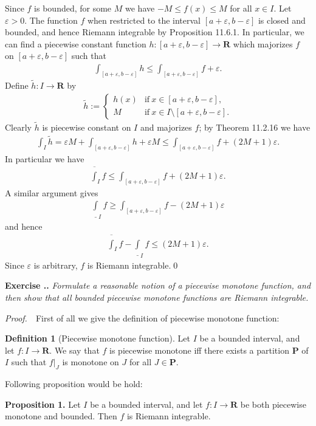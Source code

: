 \documentclass{book}
\newcommand{\pff}{\vspace{.25em}\noindent\emph{Proof.}~~}
\newcommand{\titl}[1]{\noindent\textbf{#1}}
\newcounter{Exercise}[section]
\renewcommand{\theExercise}{\thesection.\arabic{Exercise}.}
\newcommand{\new}{\vspace{1.5em}\noindent\textbf{{Exercise \stepcounter{Exercise}\textbf{\theExercise}}} }
\begin{document}
Since $f$ is bounded, for some $M$ we have $-M\leq f(x)\leq M$ for all $x\in I$. Let $\varepsilon>0$. The function $f$ when restricted to the interval $[a+\varepsilon,b-\varepsilon]$ is closed and bounded, and hence Riemann integrable by Proposition 11.6.1. In particular, we can find a piecewise constant function $h:[a+\varepsilon,b-\varepsilon]\to\mathbf{R}$ which majorizes $f$ on $[a+\varepsilon,b-\varepsilon]$ such that
    \begin{align*}
        \int_{[a+\varepsilon,b-\varepsilon]}h\leq\int_{[a+\varepsilon,b-\varepsilon]}f+\varepsilon.
    \end{align*}
Define $\widetilde{h}:I\to\mathbf{R}$ by
    \begin{align*}
        \widetilde{h}:=\left\{\begin{array}{ll}
            h(x)&\text{if}\ x\in[a+\varepsilon,b-\varepsilon],\\
            M&\text{if}\ x\in I\setminus[a+\varepsilon,b-\varepsilon].
        \end{array}\right.
    \end{align*}
Clearly $\widetilde{h}$ is piecewise constant on $I$ and majorizes $f$; by Theorem 11.2.16 we have
    \begin{align*}
        \int_I\widetilde{h}=\varepsilon M+\int_{[a+\varepsilon,b-\varepsilon]}h+\varepsilon M\leq\int_{[a+\varepsilon,b-\varepsilon]}f+(2M+1)\varepsilon.
    \end{align*}
In particular we have
    \begin{align*}
        \overline\int_If\leq\int_{[a+\varepsilon,b-\varepsilon]}f+(2M+1)\varepsilon.
    \end{align*}
A similar argument gives
    \begin{align*}
        \underline\int_If\geq\int_{[a+\varepsilon,b-\varepsilon]}f-(2M+1)\varepsilon
    \end{align*}
and hence
    \begin{align*}
        \overline\int_If-\underline\int_If\leq(2M+1)\varepsilon.
    \end{align*}
Since $\varepsilon$ is arbitrary, $f$ is Riemann integrable.\qed

\new\emph{Formulate a reasonable notion of a piecewise monotone function, and then show that all bounded piecewise monotone functions are Riemann integrable.}

\pff First of all we give the definition of piecewise monotone function:
\begin{framed}
\titl{Definition 1} (Piecewise monotone function). Let $I$ be a bounded interval, and let $f:I\to\mathbf{R}$. We say that $f$ is piecewise monotone iff there exists a partition $\mathbf{P}$ of $I$ such that $f|_J$ is monotone on $J$ for all $J\in\mathbf{P}$.
\end{framed}
Following proposition would be hold:
\begin{framed}
\titl{Proposition 1.} Let $I$ be a bounded interval, and let $f:I\to\mathbf{R}$ be both piecewise monotone and bounded. Then $f$ is Riemann integrable.
\end{framed}
\end{document}
